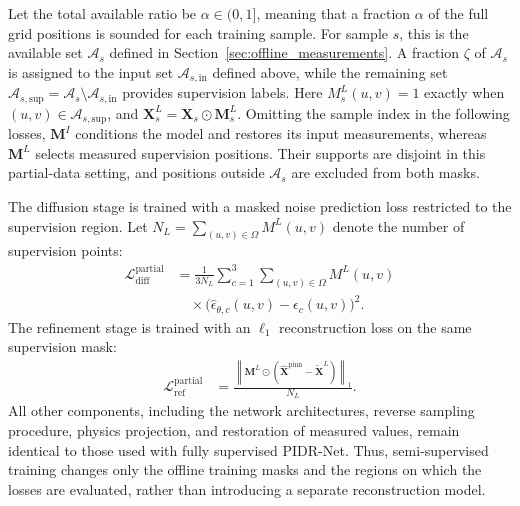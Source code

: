 \documentclass[lettersize,journal]{IEEEtran}
\newcommand{\mat}[1]{\mathbf{#1}}
\newcommand{\od}{\odot}
\newcommand{\norm}[1]{\left\lVert #1 \right\rVert}
\begin{document}
Let the total available ratio be $\alpha\in(0,1]$, meaning that a fraction $\alpha$ of the full grid positions is sounded for each training sample. For sample $s$, this is the available set $\mathcal{A}_s$ defined in Section~\ref{sec:offline_measurements}. A fraction $\zeta$ of $\mathcal{A}_s$ is assigned to the input set $\mathcal{A}_{s,\mathrm{in}}$ defined above, while the remaining set $\mathcal{A}_{s,\mathrm{sup}}=\mathcal{A}_s\setminus\mathcal{A}_{s,\mathrm{in}}$ provides supervision labels. Here $M_s^{L}(u,v)=1$ exactly when $(u,v)\in\mathcal{A}_{s,\mathrm{sup}}$, and $\mat{X}_s^{L}=\mat{X}_s\od\mat{M}_s^{L}$. Omitting the sample index in the following losses, $\mat{M}^{I}$ conditions the model and restores its input measurements, whereas $\mat{M}^{L}$ selects measured supervision positions. Their supports are disjoint in this partial-data setting, and positions outside $\mathcal{A}_s$ are excluded from both masks.

The diffusion stage is trained with a masked noise prediction loss restricted to the supervision region. Let $N_L=\sum_{(u,v)\in\Omega}M^{L}(u,v)$ denote the number of supervision points:
\begin{equation}
	\begin{aligned}
	\mathcal{L}_{\mathrm{diff}}^{\mathrm{partial}}
	&= \frac{1}{3N_L}
	\sum_{c=1}^{3}\sum_{(u,v)\in\Omega}
	M^{L}(u,v) \\
	&\quad \times
	\big(\widehat{\epsilon}_{\theta,c}(u,v)-\epsilon_c(u,v)\big)^2.
	\end{aligned}
	\label{eq:loss_diff_partial}
\end{equation}
The refinement stage is trained with an $\ell_1$ reconstruction loss on the same supervision mask:
\begin{equation}
	\begin{aligned}
	\mathcal{L}_{\mathrm{ref}}^{\mathrm{partial}}
	&=
	\frac{
		\norm{
		\mat{M}^{L}\od
		(\widehat{\mat{X}}^{\mathrm{pinn}}-\widetilde{\mat{X}}^{L})
		}_1
	}
	{N_L}.
	\end{aligned}
	\label{eq:loss_ref_partial}
\end{equation}
All other components, including the network architectures, reverse sampling procedure, physics projection, and restoration of measured values, remain identical to those used with fully supervised PIDR-Net. Thus, semi-supervised training changes only the offline training masks and the regions on which the losses are evaluated, rather than introducing a separate reconstruction model.
\end{document}
